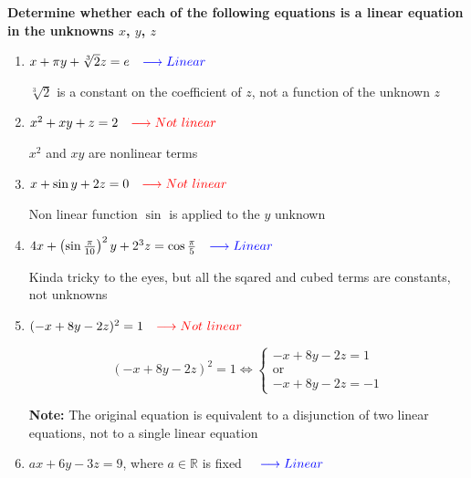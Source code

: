
\item \textbf{Determine whether each of the
following equations is a linear equation
in the unknowns $x$, $y$, $z$}

\begin{enumerate}[label=\alph*)]

    \item
    $x+\pi y+\sqrt[3]{2}z=e \quad \color{blue}{\longrightarrow Linear}$

    {\color{red} $\sqrt[3]{2}$ is a constant on the coefficient of $z$, not a function of the unknown $z$} \newline
    
    \item
    $x^2+xy+z=2 \quad \color{red}{\longrightarrow Not \ linear}$

    \begin{answer}
        $x^2$ and $xy$ are nonlinear terms
    \end{answer}

    \item
    $x+\sin y+2z=0 \quad \color{red}{\longrightarrow Not \ linear}$

    \begin{answer}
        Non linear function $\sin$ is applied to the $y$ unknown
    \end{answer}

    \item
    $4x+\left(\sin\frac{\pi}{10}\right)^2y
+2^3z=\cos\frac{\pi}{5} \quad \color{blue}{\longrightarrow Linear}$

    \begin{answer}
        Kinda tricky to the eyes, but all the sqared and cubed terms are constants, not unknowns
    \end{answer}

    \item
    $(-x+8y-2z)^2=1  \quad \color{red}{\longrightarrow Not \ linear}$

    \begin{answer}
    $$
        (-x+8y-2z)^2=1
        \iff
        \begin{cases}
            -x+8y-2z=1 \\
            \text{or} \\
            -x+8y-2z=-1
        \end{cases}
        $$

        {\color{red}
        \textbf{Note:} The original equation is equivalent to a disjunction of two
        linear equations, not to a single linear equation}
    \end{answer}

    \item
    $ax+6y-3z=9$,
    where $a\in\mathbb{R}$ is fixed  $\quad \color{blue}{\longrightarrow Linear}$

\end{enumerate}
